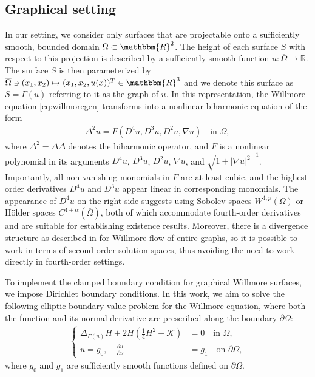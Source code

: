 \documentclass[12pt,a4paper,twoside]{article}
\newcommand{\R}{\mathbbm {R}}
\begin{document}
\subsection{Graphical setting}
In our setting, we consider only surfaces that are projectable onto a sufficiently smooth, bounded domain $\Omega\subset\R^2$. The height of each surface $S$ with respect to this projection is described by a sufficiently smooth function \( u\colon \overline{\Omega} \to \mathbb{R} \). The surface \( S \) is then parameterized by \( \overline{\Omega} \ni (x_1, x_2) \mapsto (x_1, x_2, u(x))^T \in \R^3\) and we denote this surface as \( S = \Gamma(u) \) referring to it as the graph of \( u \). In this representation, the Willmore equation \eqref{eq:willmoregen} transforms into a nonlinear biharmonic equation of the form
\begin{align}
    \Delta^2 u = F(D^4u, D^3u, D^2u, \nabla u) \quad \text{in } \Omega, \label{eq:firstrep}
\end{align}
where \( \Delta^2 = \Delta \Delta \) denotes the biharmonic operator, and \( F \) is a nonlinear polynomial in its arguments  \( D^4u \), \( D^3u \), \( D^2u \), \( \nabla u \), and \( \sqrt{1 + |\nabla u|^2}^{-1} \). Importantly, all non-vanishing monomials in $F$ are at least cubic, and the highest-order derivatives \( D^4u \) and \( D^3u \) appear linear in corresponding monomials. The appearance of $D^4 u$ on the right side suggests using Sobolev spaces \( W^{4,p}(\Omega) \) or Hölder spaces \( C^{4+\alpha}(\overline\Omega) \), both of which accommodate fourth-order derivatives and are suitable for establishing existence results. Moreover, there is a divergence structure as described in \cite{koch2012geometric} for Willmore flow of entire graphs, so it is possible to work in terms of second-order solution spaces, thus avoiding the need to work directly in fourth-order settings.

To implement the clamped boundary condition for graphical Willmore surfaces, we impose Dirichlet boundary conditions. In this work, we aim to solve the following elliptic boundary value problem for the Willmore equation, where both the function and its normal derivative are prescribed along the boundary \( \partial \Omega \):
\begin{align}
    \left\{
    \begin{aligned}
    \Delta_{\Gamma(u)} H + 2 H \left( \frac{1}{4} H^2 - \mathcal{K} \right) &= 0 \quad \text{in } \Omega, \\
    u = g_0, \quad \frac{\partial u}{\partial \nu} &= g_1 \quad \text{on } \partial \Omega,
    \end{aligned}\right. \tag{W}\label{eq:dirwillmore}
\end{align}
where \( g_0 \) and \( g_1 \) are sufficiently smooth functions defined on \( \partial \Omega \).
\end{document}
